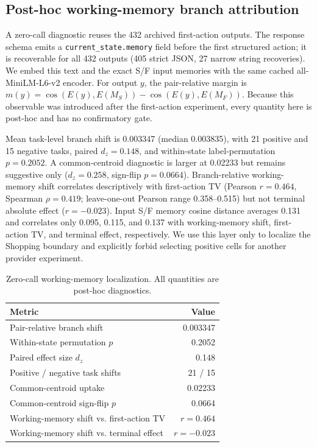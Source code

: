 \subsection{Post-hoc working-memory branch attribution}
A zero-call diagnostic reuses the 432 archived first-action outputs. The response schema emits a \texttt{current\_state.memory} field before the first structured action; it is recoverable for all 432 outputs (405 strict JSON, 27 narrow string recoveries). We embed this text and the exact S/F input memories with the same cached all-MiniLM-L6-v2 encoder. For output $y$, the pair-relative margin is $m(y)=\cos(E(y),E(M_S))-\cos(E(y),E(M_F))$. Because this observable was introduced after the first-action experiment, every quantity here is post-hoc and has no confirmatory gate.

Mean task-level branch shift is 0.003347 (median 0.003835), with 21 positive and 15 negative tasks, paired $d_z=0.148$, and within-state label-permutation $p=0.2052$. A common-centroid diagnostic is larger at 0.02233 but remains suggestive only ($d_z=0.258$, sign-flip $p=0.0664$). Branch-relative working-memory shift correlates descriptively with first-action TV (Pearson $r=0.464$, Spearman $\rho=0.419$; leave-one-out Pearson range 0.358--0.515) but not terminal absolute effect ($r=-0.023$). Input S/F memory cosine distance averages 0.131 and correlates only 0.095, 0.115, and 0.137 with working-memory shift, first-action TV, and terminal effect, respectively. We use this layer only to localize the Shopping boundary and explicitly forbid selecting positive cells for another provider experiment.

\begin{table}[h]
\centering
\small
\caption{Zero-call working-memory localization. All quantities are post-hoc diagnostics.}
\label{tab:working-memory-posthoc}
\begin{tabular}{lr}
\toprule
Metric & Value \\
\midrule
Pair-relative branch shift & 0.003347 \\
Within-state permutation $p$ & 0.2052 \\
Paired effect size $d_z$ & 0.148 \\
Positive / negative task shifts & 21 / 15 \\
Common-centroid uptake & 0.02233 \\
Common-centroid sign-flip $p$ & 0.0664 \\
Working-memory shift vs. first-action TV & $r=0.464$ \\
Working-memory shift vs. terminal effect & $r=-0.023$ \\
\bottomrule
\end{tabular}
\end{table}

